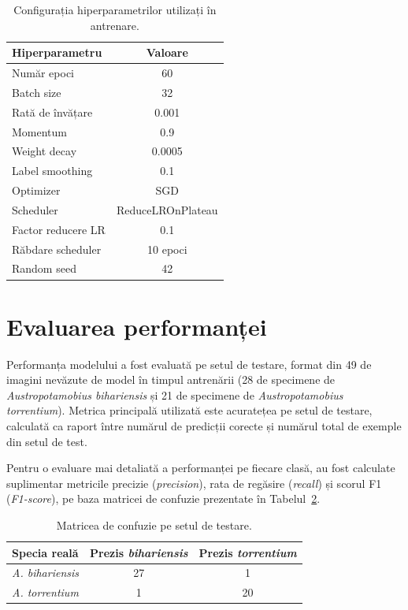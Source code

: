 \begin{table}[H]
\centering
\caption{Configurația hiperparametrilor utilizați în antrenare.}
\label{tab:hiperparametri}
\begin{tabular}{lc}
\hline
\textbf{Hiperparametru} & \textbf{Valoare} \\
\hline
Număr epoci          & 60 \\
Batch size           & 32 \\
Rată de învățare     & 0.001 \\
Momentum             & 0.9 \\
Weight decay         & 0.0005 \\
Label smoothing      & 0.1 \\
Optimizer            & SGD \\
Scheduler            & ReduceLROnPlateau \\
Factor reducere LR   & 0.1 \\
Răbdare scheduler    & 10 epoci \\
Random seed          & 42 \\
\hline
\end{tabular}
\end{table}








\section{Evaluarea performanței}

Performanța modelului a fost evaluată pe setul de testare, format din 49 de imagini nevăzute de model în timpul antrenării (28 de specimene de \textit{Austropotamobius bihariensis} și 21 de specimene de \textit{Austropotamobius torrentium}). Metrica principală utilizată este acuratețea pe setul de testare, calculată ca raport între numărul de predicții corecte și numărul total de exemple din setul de test.

Pentru o evaluare mai detaliată a performanței pe fiecare clasă, au fost calculate suplimentar metricile precizie (\textit{precision}), rata de regăsire (\textit{recall}) și scorul F1 (\textit{F1-score}), pe baza matricei de confuzie prezentate în Tabelul~\ref{tab:confuzie}.

\begin{table}[H]
\centering
\caption{Matricea de confuzie pe setul de testare.}
\label{tab:confuzie}
\begin{tabular}{lcc}
\hline
\textbf{Specia reală} & \textbf{Prezis \textit{bihariensis}} & \textbf{Prezis \textit{torrentium}} \\
\hline
\textit{A. bihariensis} & 27 & 1 \\
\textit{A. torrentium}  & 1  & 20 \\
\hline
\end{tabular}
\end{table}

